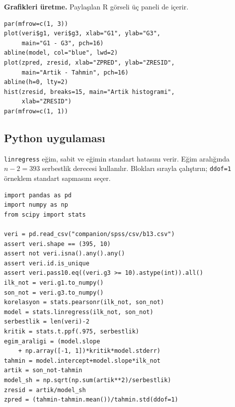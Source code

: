 \par\noindent\begin{minipage}{\linewidth}
\textbf{Grafikleri üretme.} Paylaşılan R görseli üç paneli de içerir.

\begin{lstlisting}[style=prismR]
par(mfrow=c(1, 3))
plot(veri$g1, veri$g3, xlab="G1", ylab="G3",
     main="G1 - G3", pch=16)
abline(model, col="blue", lwd=2)
plot(zpred, zresid, xlab="ZPRED", ylab="ZRESID",
     main="Artik - Tahmin", pch=16)
abline(h=0, lty=2)
hist(zresid, breaks=15, main="Artik histogrami",
     xlab="ZRESID")
par(mfrow=c(1, 1))
\end{lstlisting}
\end{minipage}\par

\par\noindent\begin{minipage}{\linewidth}
\subsection{Python uygulaması}
\label{sec:python-b13}

\texttt{linregress} eğim, sabit ve eğimin standart hatasını verir.
Eğim aralığında $n-2=393$ serbestlik derecesi kullanılır.
Blokları sırayla çalıştırın; \texttt{ddof=1} örneklem standart
sapmasını seçer.

\begin{lstlisting}[style=prismPythonApp]
import pandas as pd
import numpy as np
from scipy import stats

veri = pd.read_csv("companion/spss/csv/b13.csv")
assert veri.shape == (395, 10)
assert not veri.isna().any().any()
assert veri.id.is_unique
assert veri.pass10.eq((veri.g3 >= 10).astype(int)).all()
ilk_not = veri.g1.to_numpy()
son_not = veri.g3.to_numpy()
korelasyon = stats.pearsonr(ilk_not, son_not)
model = stats.linregress(ilk_not, son_not)
serbestlik = len(veri)-2
kritik = stats.t.ppf(.975, serbestlik)
egim_araligi = (model.slope
    + np.array([-1, 1])*kritik*model.stderr)
tahmin = model.intercept+model.slope*ilk_not
artik = son_not-tahmin
model_sh = np.sqrt(np.sum(artik**2)/serbestlik)
zresid = artik/model_sh
zpred = (tahmin-tahmin.mean())/tahmin.std(ddof=1)
\end{lstlisting}
\end{minipage}\par

